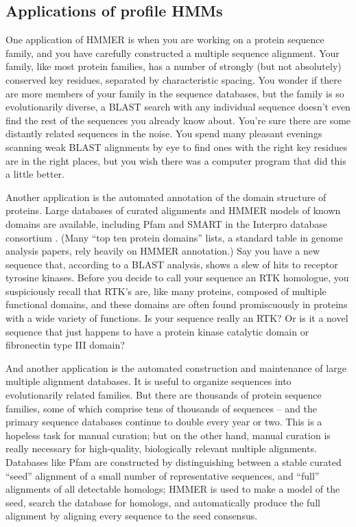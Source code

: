\subsection{Applications of profile HMMs}

One application of HMMER is when you are working on a protein sequence
family, and you have carefully constructed a multiple sequence
alignment. Your family, like most protein families, has a number of
strongly (but not absolutely) conserved key residues, separated by
characteristic spacing. You wonder if there are more members of your
family in the sequence databases, but the family is so evolutionarily
diverse, a BLAST search with any individual sequence doesn't even find
the rest of the sequences you already know about. You're sure there
are some distantly related sequences in the noise. You spend many
pleasant evenings scanning weak BLAST alignments by eye to find ones
with the right key residues are in the right places, but you wish
there was a computer program that did this a little better.

Another application is the automated annotation of the domain
structure of proteins. Large databases of curated alignments and HMMER
models of known domains are available, including Pfam \cite{Bateman02}
and SMART \cite{LetunicBork02} in the Interpro database consortium
\cite{Mulder03}. (Many ``top ten protein domains'' lists, a standard
table in genome analysis papers, rely heavily on HMMER annotation.)
Say you have a new sequence that, according to a BLAST analysis, shows
a slew of hits to receptor tyrosine kinases. Before you decide to call
your sequence an RTK homologue, you suspiciously recall that RTK's
are, like many proteins, composed of multiple functional domains, and
these domains are often found promiscuously in proteins with a wide
variety of functions. Is your sequence really an RTK? Or is it a novel
sequence that just happens to have a protein kinase catalytic domain
or fibronectin type III domain?

And another application is the automated construction and maintenance
of large multiple alignment databases.  It is useful to organize
sequences into evolutionarily related families. But there are
thousands of protein sequence families, some of which comprise tens of
thousands of sequences -- and the primary sequence databases continue
to double every year or two. This is a hopeless task for manual
curation; but on the other hand, manual curation is really necessary
for high-quality, biologically relevant multiple alignments. Databases
like Pfam \cite{Bateman02} are constructed by distinguishing between a
stable curated ``seed'' alignment of a small number of representative
sequences, and ``full'' alignments of all detectable homologs; HMMER
is used to make a model of the seed, search the database for homologs,
and automatically produce the full alignment by aligning every
sequence to the seed consensus.

